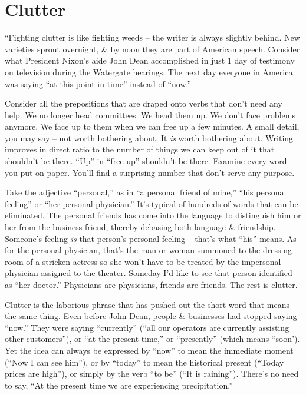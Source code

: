 \documentclass{article}
\begin{document}
\section{Clutter}
``Fighting clutter is like fighting weeds -- the writer is always slightly behind. New varieties sprout overnight, \& by noon they are part of American speech. Consider what President Nixon's aide John Dean accomplished in just 1 day of testimony on television during the Watergate hearings. The next day everyone in America was saying ``at this point in time'' instead of ``now.''

Consider all the prepositions that are draped onto verbs that don't need any help. We no longer head committees. We head them up. We don't face problems anymore. We face up to them when we can free up a few minutes. A small detail, you may say -- not worth bothering about. It \textit{is} worth bothering about. Writing improves in direct ratio to the number of things we can keep out of it that shouldn't be there. ``Up'' in ``free up'' shouldn't be there. Examine every word you put on paper. You'll find a surprising number that don't serve any purpose.

Take the adjective ``personal,'' as in ``a personal friend of mine,'' ``his personal feeling'' or ``her personal physician.'' It's typical of hundreds of words that can be eliminated. The personal friends has come into the language to distinguish him or her from the business friend, thereby debasing both language \& friendship. Someone's feeling \textit{is} that person's personal feeling -- that's what ``his'' means. As for the personal physician, that's the man or woman summoned to the dressing room of a stricken actress so she won't have to be treated by the impersonal physician assigned to the theater. Someday I'd like to see that person identified as ``her doctor.'' Physicians are physicians, friends are friends. The rest is clutter.

Clutter is the laborious phrase that has pushed out the short word that means the same thing. Even before John Dean, people \& businesses had stopped saying ``now.'' They were saying ``currently'' (``all our operators are currently assisting other customers''), or ``at the present time,'' or ``presently'' (which means ``soon'). Yet the idea can always be expressed by ``now'' to mean the immediate moment (``Now I can see him''), or by ``today'' to mean the historical present (``Today prices are high''), or simply by the verb ``to be'' (``It is raining''). There's no need to say, ``At the present time we are experiencing precipitation.''
\end{document}
